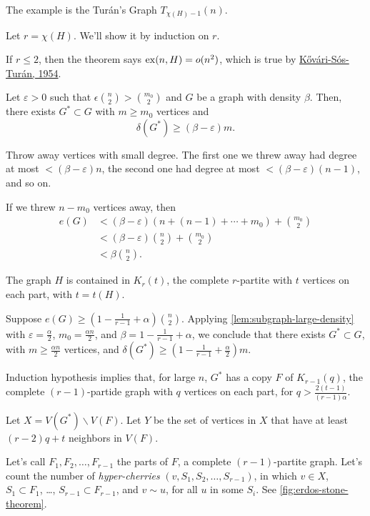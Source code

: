 \begin{sk}
	The example is the Turán's Graph $T_{\chi(H)-1}(n)$.

	Let $r = \chi(H)$. 
	We'll show it by induction on $r$.

	If $r \le 2$, then the theorem says $\operatorname{ex}(n, H) = o(n^2)$, which is true by \hyperref[thm:kovari-sos-turan-1954]{K\H{o}vári-Sós-Turán, 1954}.

	\begin{lem}\label{lem:subgraph-large-density}
		Let $\varepsilon > 0$ such that $\epsilon\binom{n}{2} > \binom{m_0}{2}$ and $G$ be a graph with density $\beta$. Then, there exists $G^* \subset G$ with $m \ge m_0$ vertices and  \[
			\delta(G^*) \ge (\beta - \varepsilon)m.
		\]
	\end{lem}
	\begin{sk}
		Throw away vertices with small degree. The first one we threw away had degree at most $< (\beta - \varepsilon)n$, the second one had degree at most $< (\beta - \varepsilon)(n-1)$, and so on.

		If we threw $n-m_0$ vertices away, then
		\begin{align*}
			e(G) &< (\beta - \varepsilon) (n + (n-1) + \cdots + m_0) + \binom{m_0}{2}\\
				 &< (\beta - \varepsilon) \binom{n}{2} + \binom{m_0}{2}\\
				 &< \beta\binom{n}{2}.
		\end{align*}
	\end{sk}

	The graph $H$ is contained in $K_{r}(t)$, the complete $r$-partite with $t$ vertices on each part, with $t = t(H)$.

	Suppose $e(G) \ge \left(1 - \frac{1}{r-1} + \alpha\right)\binom{n}{2}$. Applying \cref{lem:subgraph-large-density} with $\varepsilon = \frac{\alpha}{2}$, $m_0 = \frac{\alpha n}{2}$, and $\beta = 1 - \frac{1}{r-1} + \alpha$, we conclude that there exists $G^* \subset G$, with $m \ge \frac{\alpha n}{2}$ vertices, and $\delta(G^*) \ge \left(1 - \frac{1}{r-1} + \frac{\alpha}{2}\right)m$.

	Induction hypothesis implies that, for large $n$, $G^*$ has a copy $F$ of $K_{r-1}(q)$, the complete $(r-1)$-partide graph with $q$ vertices on each part, for $q > \frac{2(t-1)}{(r-1)\alpha}$.

	Let $X = V(G^*) \backslash V(F)$.
	Let $Y$ be the set of vertices in $X$ that have at least $(r-2)q + t$ neighbors in $V(F)$.

	Let's call $F_1, F_2, \dots, F_{r-1}$ the parts of $F$, a complete $(r-1)$-partite graph. Let's count the number of \emph{hyper-cherries} $(v, S_1, S_2, \dots, S_{r-1})$, in which $v \in X$, $S_1 \subset F_1$, \dots, $S_{r-1} \subset F_{r-1}$, and $v \sim u$, for all $u$ in some $S_i$. See \cref{fig:erdos-stone-theorem}.


\end{sk}

